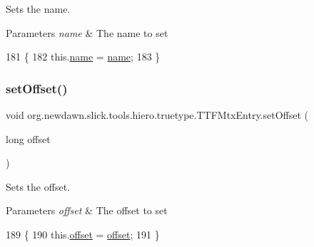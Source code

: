 Sets the name. 
\begin{DoxyParams}{Parameters}
{\em name} & The name to set \\
\hline
\end{DoxyParams}

\begin{DoxyCode}
181                                      \{
182         this.\mbox{\hyperlink{classorg_1_1newdawn_1_1slick_1_1tools_1_1hiero_1_1truetype_1_1_t_t_f_mtx_entry_ae97e3e4402e1061ce454dedc52a1cab4}{name}} = \mbox{\hyperlink{classorg_1_1newdawn_1_1slick_1_1tools_1_1hiero_1_1truetype_1_1_t_t_f_mtx_entry_ae97e3e4402e1061ce454dedc52a1cab4}{name}};
183     \}
\end{DoxyCode}
\mbox{\label{classorg_1_1newdawn_1_1slick_1_1tools_1_1hiero_1_1truetype_1_1_t_t_f_mtx_entry_abf6b37042a30d1c10cc6acf16ba054ff}} 
\subsubsection{\texorpdfstring{set\+Offset()}{setOffset()}}
{\footnotesize\ttfamily void org.\+newdawn.\+slick.\+tools.\+hiero.\+truetype.\+T\+T\+F\+Mtx\+Entry.\+set\+Offset (\begin{DoxyParamCaption}\item[{long}]{offset }\end{DoxyParamCaption})\hspace{0.3cm}{\ttfamily [inline]}}

Sets the offset. 
\begin{DoxyParams}{Parameters}
{\em offset} & The offset to set \\
\hline
\end{DoxyParams}

\begin{DoxyCode}
189                                        \{
190         this.\mbox{\hyperlink{classorg_1_1newdawn_1_1slick_1_1tools_1_1hiero_1_1truetype_1_1_t_t_f_mtx_entry_a85ab264e853728a03b18417ab1511575}{offset}} = \mbox{\hyperlink{classorg_1_1newdawn_1_1slick_1_1tools_1_1hiero_1_1truetype_1_1_t_t_f_mtx_entry_a85ab264e853728a03b18417ab1511575}{offset}};
191     \}
\end{DoxyCode}
\mbox{\label{classorg_1_1newdawn_1_1slick_1_1tools_1_1hiero_1_1truetype_1_1_t_t_f_mtx_entry_aef2946f523441d2773f964fed7e83a29}} 
